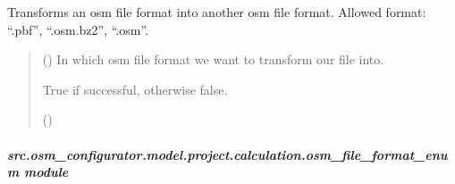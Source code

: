 \documentclass[letterpaper,10pt,english]{sphinxmanual}
\begin{document}
\begin{fulllineitems}
\begin{fulllineitems}
\label{\detokenize{apidoc/src.osm_configurator.model.project.calculation:src.osm_configurator.model.project.calculation.osm_file_converter.OSMFileConverter.convert_file}}
\pysigstartsignatures
{}
\pysigstopsignatures
\sphinxAtStartPar
Transforms an osm file format into another osm file format.
Allowed format: “.pbf”, “.osm.bz2”, “.osm”.
\begin{quote}\begin{description}
\sphinxAtStartPar
{} ({\hyperref[\detokenize{apidoc/src.osm_configurator.model.project.calculation:src.osm_configurator.model.project.calculation.osm_file_format_enum.OSMFileFormat}]{}}) \textendash{} In which osm file format we want to transform our file into.

\sphinxAtStartPar
True if successful, otherwise false.

\sphinxAtStartPar
()

\end{description}\end{quote}

\end{fulllineitems}


\end{fulllineitems}



\subparagraph{src.osm\_configurator.model.project.calculation.osm\_file\_format\_enum module}
\label{\detokenize{apidoc/src.osm_configurator.model.project.calculation:module-src.osm_configurator.model.project.calculation.osm_file_format_enum}}\label{\detokenize{apidoc/src.osm_configurator.model.project.calculation:src-osm-configurator-model-project-calculation-osm-file-format-enum-module}}
\end{document}
